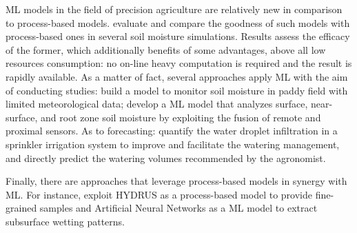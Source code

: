 ML models in the field of precision agriculture are relatively new in comparison to process-based models.
\cite{Karandish2016892} evaluate and compare the goodness of such models with process-based ones in several soil moisture simulations.
Results assess the efficacy of the former, which additionally benefits of some advantages, above all low resources consumption: no on-line heavy computation is required and the result is rapidly available.
As a matter of fact, several approaches apply ML with the aim of conducting studies: \cite{arif2013estimation} build a model to monitor soil moisture in paddy field with limited meteorological data; \cite{Babaeian2021} develop a ML model that analyzes surface, near-surface, and root zone soil moisture by exploiting the fusion of remote and proximal sensors.
As to forecasting: \cite{Liang2021} quantify the water droplet infiltration in a sprinkler irrigation system to improve and facilitate the watering management, \cite{Jimenez20201327} and \cite{Goldstein2018421} directly predict the watering volumes recommended by the agronomist.

Finally, there are approaches that leverage process-based models in synergy with ML.
For instance, \cite{Hinnell2010535} exploit HYDRUS as a process-based model to provide fine-grained samples and Artificial Neural Networks as a ML model to extract subsurface wetting patterns.




